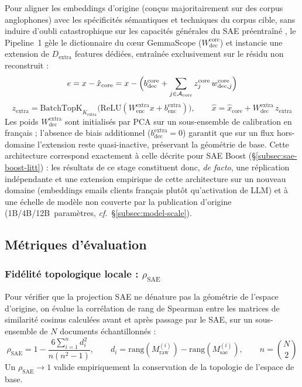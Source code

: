 \documentclass[11pt]{article}
\begin{document}
Pour aligner les embeddings d'origine (conçus majoritairement sur des corpus
anglophones) avec les spécificités sémantiques et techniques du corpus cible,
sans induire d'oubli catastrophique sur les capacités générales du SAE
préentraîné \cite{lieberum2024gemmascope}, le Pipeline~1 gèle le dictionnaire du cœur GemmaScope
($W_\text{dec}^\text{core}$) et instancie une extension de $D_\text{extra}$
features dédiées, entraînée exclusivement sur le résidu non reconstruit :
\[
  e = x - \hat{x}_\text{core} = x - \Bigl(b_\text{dec}^\text{core} +
  \sum_{j \in \mathcal{A}_\text{core}} z_j^\text{core}\, w_{\text{dec},j}^\text{core}\Bigr)
\]
\[
  z_\text{extra} = \text{BatchTopK}_{K_\text{extra}}\bigl(\text{ReLU}(W_\text{enc}^\text{extra} x + b_\text{enc}^\text{extra})\bigr), \qquad
  \hat{x} = \hat{x}_\text{core} + W_\text{dec}^\text{extra}\, z_\text{extra}
\]
Les poids $W_\text{dec}^\text{extra}$ sont initialisés par PCA sur un
sous-ensemble de calibration en français ; l'absence de biais additionnel
($b_\text{dec}^\text{extra}=0$) garantit que sur un flux hors-domaine
l'extension reste quasi-inactive, préservant la géométrie de base. Cette
architecture correspond exactement à celle décrite pour SAE Boost
(\S\ref{subsec:sae-boost-litt}) : les résultats de ce stage constituent donc,
\emph{de facto}, une réplication indépendante et une extension empirique de
cette architecture sur un nouveau domaine (embeddings emails clients français plutôt qu'activation de LLM) et à une
échelle de modèle non couverte par la publication d'origine
(1B/4B/12B~paramètres, \emph{cf.}~\S\ref{subsec:model-scale}).

\subsection{Métriques d'évaluation}

\subsubsection{Fidélité topologique locale : \texorpdfstring{$\rho_\text{SAE}$}{rho\_SAE}}
Pour vérifier que la projection SAE ne dénature pas la géométrie de l'espace
d'origine, on évalue la corrélation de rang de Spearman entre les matrices de
similarité cosinus calculées avant et après passage par le SAE, sur un
sous-ensemble de $N$ documents échantillonnés :
\[
  \rho_\text{SAE} = 1 - \frac{6\sum_{i=1}^n d_i^2}{n(n^2-1)}, \qquad
  d_i = \text{rang}(M_\text{raw}^{(i)}) - \text{rang}(M_\text{sae}^{(i)}), \qquad
  n = \binom{N}{2}
\]
Un $\rho_\text{SAE} \to 1$ valide empiriquement la conservation de la
topologie de l'espace de base.
\end{document}
